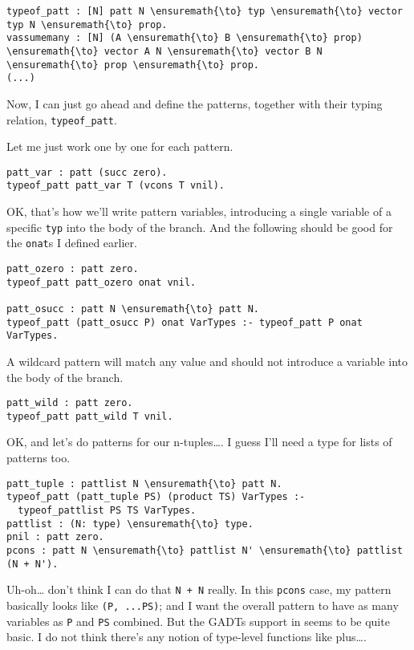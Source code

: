 \begin{verbatim}
typeof_patt : [N] patt N \ensuremath{\to} typ \ensuremath{\to} vector typ N \ensuremath{\to} prop.
vassumemany : [N] (A \ensuremath{\to} B \ensuremath{\to} prop) \ensuremath{\to} vector A N \ensuremath{\to} vector B N \ensuremath{\to} prop \ensuremath{\to} prop.
(...)
\end{verbatim}

Now, I can just go ahead and define the patterns, together with their
typing relation, \texttt{typeof\_patt}.

Let me just work one by one for each pattern.

\begin{verbatim}
patt_var : patt (succ zero).
typeof_patt patt_var T (vcons T vnil).
\end{verbatim}

OK, that's how we'll write pattern variables, introducing a single
variable of a specific \texttt{typ} into the body of the branch. And the
following should be good for the \texttt{onat}s I defined earlier.

\begin{verbatim}
patt_ozero : patt zero.
typeof_patt patt_ozero onat vnil.

patt_osucc : patt N \ensuremath{\to} patt N.
typeof_patt (patt_osucc P) onat VarTypes :- typeof_patt P onat VarTypes.
\end{verbatim}

A wildcard pattern will match any value and should not introduce a
variable into the body of the branch.

\begin{verbatim}
patt_wild : patt zero.
typeof_patt patt_wild T vnil.
\end{verbatim}

OK, and let's do patterns for our n-tuples\ldots{}. I guess I'll need a
type for lists of patterns too.

\begin{verbatim}
patt_tuple : pattlist N \ensuremath{\to} patt N.
typeof_patt (patt_tuple PS) (product TS) VarTypes :-
  typeof_pattlist PS TS VarTypes.
pattlist : (N: type) \ensuremath{\to} type.
pnil : patt zero.
pcons : patt N \ensuremath{\to} pattlist N' \ensuremath{\to} pattlist (N + N').
\end{verbatim}

Uh-oh\ldots{} don't think I can do that
\texttt{N\ +\ N\textquotesingle{}} really. In this \texttt{pcons} case,
my pattern basically looks like \texttt{(P,\ ...PS)}; and I want the
overall pattern to have as many variables as \texttt{P} and \texttt{PS}
combined. But the GADTs support in \lamprolog seems to be quite basic. I
do not think there's any notion of type-level functions like
plus\ldots{}.

